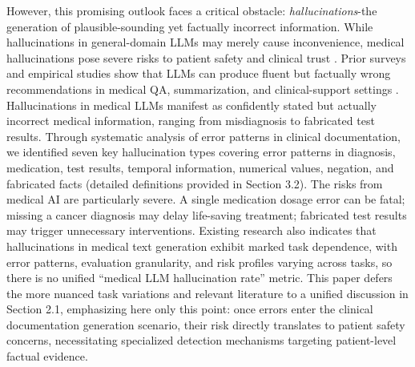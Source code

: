 \documentclass[11pt]{article}
\begin{document}
However, this promising outlook faces a critical obstacle: \emph{hallucinations}-the generation of plausible-sounding yet factually incorrect information. While hallucinations in general-domain LLMs may merely cause inconvenience, medical hallucinations pose severe risks to patient safety and clinical trust \citep{alkaissi2023chatgptHallucinations}. Prior surveys and empirical studies show that LLMs can produce fluent but factually wrong recommendations in medical QA, summarization, and clinical-support settings \citep{thirunavukarasu2023llmMedicine,rajpurkar2022aiHealthMedicine}. Hallucinations in medical LLMs manifest as confidently stated but actually incorrect medical information, ranging from misdiagnosis to fabricated test results. Through systematic analysis of error patterns in clinical documentation, we identified seven key hallucination types covering error patterns in diagnosis, medication, test results, temporal information, numerical values, negation, and fabricated facts (detailed definitions provided in Section 3.2). The risks from medical AI are particularly severe. A single medication dosage error can be fatal; missing a cancer diagnosis may delay life-saving treatment; fabricated test results may trigger unnecessary interventions. Existing research also indicates that hallucinations in medical text generation exhibit marked task dependence, with error patterns, evaluation granularity, and risk profiles varying across tasks, so there is no unified ``medical LLM hallucination rate'' metric. This paper defers the more nuanced task variations and relevant literature to a unified discussion in Section 2.1, emphasizing here only this point: once errors enter the clinical documentation generation scenario, their risk directly translates to patient safety concerns, necessitating specialized detection mechanisms targeting patient-level factual evidence.
\end{document}
